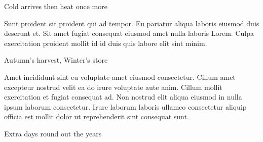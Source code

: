 {\mktsHTwo{}\cjkgGlue{} Cold arrives then heat once more\mktsHTwoBEG}%


\vspace{\myLineheight}\begin{multicols}{2}\raggedcolumns{}Sunt proident sit proident qui ad tempor. Eu pariatur aliqua laboris eiusmod duis deserunt et. Sit amet fugiat consequat eiusmod amet nulla laboris Lorem. Culpa exercitation proident mollit id id duis quis labore elit sint minim.



\end{multicols}


{\mktsHOne{}\cjkgGlue{} Autumn’s harvest, Winter’s store\mktsHOneBEG}%


\vspace{\myLineheight}\begin{multicols}{2}\raggedcolumns{}Amet incididunt sint eu voluptate amet eiusmod consectetur. Cillum amet excepteur nostrud velit ea do irure voluptate aute anim. Cillum mollit exercitation et fugiat consequat ad. Non nostrud elit aliqua eiusmod in nulla ipsum laborum consectetur. Irure laborum laboris ullamco consectetur aliquip officia est mollit dolor ut reprehenderit sint consequat sunt.



\end{multicols}


{\mktsHTwo{}\cjkgGlue{} Extra days round out the years\mktsHTwoBEG}%


